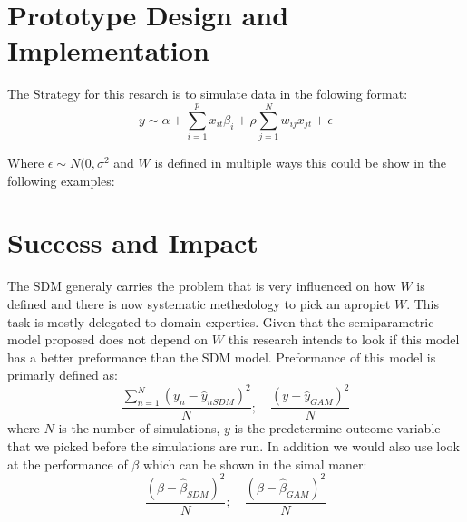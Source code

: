 \documentclass{article}
\begin{document}
\section{Prototype Design and Implementation}

The Strategy for this resarch is to simulate data in the folowing format:
\begin{equation}
	y \sim \alpha + \sum^p_{i=1} x_{it} \beta_i + \rho \sum^N_{j=1} w_{ij} x_{jt} + \epsilon
\end{equation}

Where $\epsilon \sim N(0,\sigma^2$ and $W$ is defined in multiple ways this could be show in the following examples:

\section{Success and Impact}

The SDM generaly carries the problem that is very influenced on how $W$ is defined and there is now systematic
methedology to pick an apropiet $W$. This task is mostly delegated to domain experties. Given that the semiparametric
model proposed does not depend on $W$ this research intends to look if this model has a better preformance than the SDM model.
Preformance of this model is primarly defined as:
\begin{equation}
	\frac{\sum_{n=1}^N(y_n-\hat{y}_{nSDM})^2}{N}; \quad \frac{(y-\hat{y}_{GAM})^2}{N}
	\label{eq:pref}
\end{equation}
where $N$ is the number of simulations, $y$ is the predetermine outcome variable that we picked before the simulations are run.
In addition we would also use look at the performance of $\beta$ which can be shown in the simal maner:
\begin{equation}
	\frac{(\beta-\hat{\beta}_{SDM})^2}{N}; \quad \frac{(\beta-\hat{\beta}_{GAM})^2}{N}
	\label{eq:pref2}
\end{equation}





\end{document}
